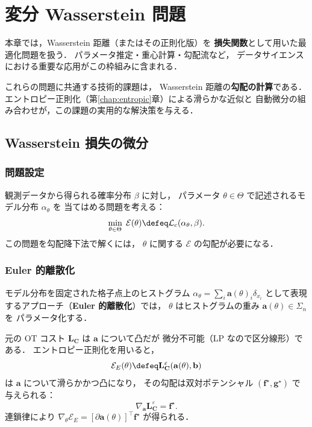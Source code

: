 
\chapter{変分 Wasserstein 問題}\label{chap:variational}

本章では，Wasserstein 距離（またはその正則化版）を
\textbf{損失関数}として用いた最適化問題を扱う．
パラメータ推定・重心計算・勾配流など，
データサイエンスにおける重要な応用がこの枠組みに含まれる．

これらの問題に共通する技術的課題は，
Wasserstein 距離の\textbf{勾配の計算}である．
エントロピー正則化（第\ref{chap:entropic}章）による滑らかな近似と
自動微分の組み合わせが，この課題の実用的な解決策を与える．


\section{Wasserstein 損失の微分}\label{sec:diff-wasserstein}

\subsection{問題設定}\label{subsec:fitting}

観測データから得られる確率分布 $\beta$ に対し，
パラメータ $\theta \in \Theta$ で記述されるモデル分布 $\alpha_\theta$ を
当てはめる問題を考える：
\begin{equation}\label{eq:fitting}
  \min_{\theta \in \Theta}\; \mathcal{E}(\theta)
  \defeq \mathcal{L}_c(\alpha_\theta, \beta).
\end{equation}
この問題を勾配降下法で解くには，
$\theta$ に関する $\mathcal{E}$ の勾配が必要になる．

\subsection{Euler 的離散化}\label{subsec:eulerian}

モデル分布を固定された格子点上のヒストグラム
$\alpha_\theta = \sum_i \mathbf{a}(\theta)_i \delta_{x_i}$
として表現するアプローチ（\textbf{Euler 的離散化}）では，
$\theta$ はヒストグラムの重み $\mathbf{a}(\theta) \in \Sigma_n$ を
パラメータ化する．

元の OT コスト $\mathbf{L_C}$ は $\mathbf{a}$ について凸だが
微分不可能（LP なので区分線形）である．
エントロピー正則化を用いると，
\[
  \mathcal{E}_E(\theta) \defeq
  \mathbf{L}^\varepsilon_{\mathbf{C}}(\mathbf{a}(\theta), \mathbf{b})
\]
は $\mathbf{a}$ について滑らかかつ凸になり，
その勾配は双対ポテンシャル $(\mathbf{f}^\star, \mathbf{g}^\star)$ で与えられる：
\[
  \nabla_{\mathbf{a}} \mathbf{L}^\varepsilon_{\mathbf{C}}
  = \mathbf{f}^\star.
\]
連鎖律により
$\nabla_\theta \mathcal{E}_E = [\partial \mathbf{a}(\theta)]^\top \mathbf{f}^\star$
が得られる．

